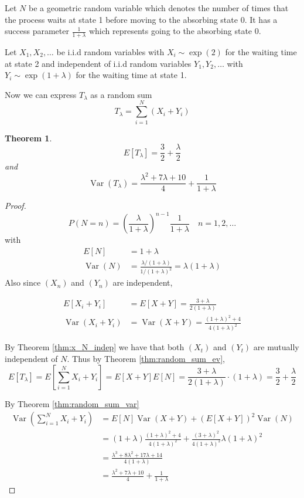 \documentclass{article}
\theoremstyle{plain}
\newtheorem{theorem}{Theorem}[section]
\theoremstyle{definition}
\theoremstyle{remark}
\numberwithin{equation}{section}
\newcommand{\Var}{\operatorname {Var}}
\begin{document}
Let $N$ be a geometric random variable which denotes the number of times that the process waits at state 1 before moving to the absorbing state 0.
It has a success parameter $\frac{1}{1 + \lambda}$ which represents going to the absorbing state 0.

Let $X_1, X_2, \ldots$ be i.i.d random variables with
$X_i \sim \exp(2)$ for the waiting time at state 2 and independent of i.i.d random variables $Y_1, Y_2, \ldots$ with  $Y_i \sim \exp(1 + \lambda)$ for the waiting time at state 1.

Now we can express $T_\lambda$ as a random sum
$$
T_\lambda = \sum_{i = 1}^N (X_i + Y_i)
$$

\begin{theorem}
$$
E[T_\lambda] = \frac{3}{2} + \frac{\lambda}{2}
$$
and
$$
\Var(T_\lambda) = \frac{\lambda^2 + 7 \lambda + 10}{4} + \frac{1}{1 + \lambda}
$$
\end{theorem}

\begin{proof}
$$
P(N = n) = \left(\frac{\lambda}{1 + \lambda} \right)^{n - 1} \frac{1}{1 + \lambda} \quad n = 1,2,\ldots
$$
with
\begin{align*}
    E[N] &= 1 + \lambda\\
    \Var(N) &= \frac{\lambda/(1 + \lambda)}{1/(1 + \lambda)^2} = \lambda (1 + \lambda)
\end{align*}
Also since $(X_n)$ and $(Y_n)$ are independent,

\begin{align*}
    E[X_i + Y_i] &= E[X + Y] = \frac{3 + \lambda}{2(1 + \lambda)}\\
    \Var(X_i + Y_i) &= \Var(X + Y) = \frac{(1 + \lambda)^2 + 4}{4(1 + \lambda)^2}
\end{align*}

By Theorem \ref{thm:x_N_indep} we have that both $(X_t)$ and $(Y_t)$ are mutually independent of $N$.
Thus by Theorem \eqref{thm:random_sum_ev},
$$
E[T_\lambda] = E\left[ \sum_{i = 1}^N X_i + Y_i \right] = E[X + Y] E[N] = \frac{3 + \lambda}{2(1 + \lambda)} \cdot (1 + \lambda) = \frac{3}{2} + \frac{\lambda}{2}
$$

By Theorem \ref{thm:random_sum_var}
\begin{align*}
    \Var\left( \sum_{i = 1}^N X_i + Y_i \right) &= E[N]\Var(X + Y) + (E[X + Y])^2 \Var(N)\\
    &= (1 + \lambda) \frac{(1 + \lambda)^2 + 4}{4(1 + \lambda)^2} + \frac{(3 + \lambda)^2}{4 (1 + \lambda)^2} \lambda (1 + \lambda)^2\\
    &= \frac{\lambda^3 + 8 \lambda^2 + 17 \lambda + 14}{4(1 + \lambda)}\\
    &= \frac{\lambda^2 + 7 \lambda + 10}{4} + \frac{1}{1 + \lambda}
\end{align*}
\end{proof}
\end{document}

